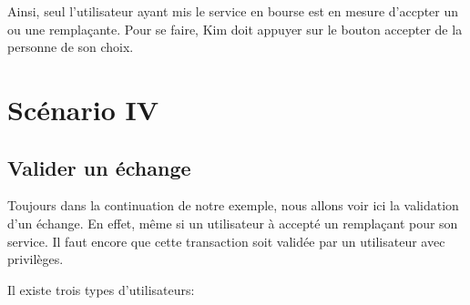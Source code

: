     Ainsi, seul l'utilisateur ayant mis le service en bourse est en mesure d'accpter un ou une remplaçante. Pour se faire,
    Kim doit appuyer sur le bouton accepter de la personne de son choix.

\section[Valider un échange - Scénario IV]{Scénario IV}
    \subsection*{Valider un échange}
    Toujours dans la continuation de notre exemple, nous allons voir ici 
    la validation d'un échange. En effet, même si un utilisateur
    à accepté un remplaçant pour son service. Il faut encore que cette
    transaction soit validée par un utilisateur avec privilèges.

    Il existe trois types d'utilisateurs:
    \begin{center}
    \end{center}
    

